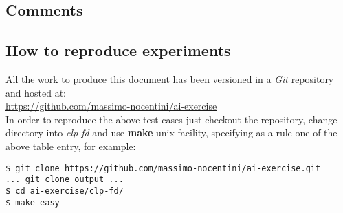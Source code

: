 \documentclass[10pt,a4paper]{article} %
\begin{document}
    \subsection{Comments}
    \lipsum[1]

    \subsection{How to reproduce experiments}
    All the work to produce this document has been versioned in a
    \emph{Git} repository and hosted at:\\
    \url{https://github.com/massimo-nocentini/ai-exercise}\\
    In order to reproduce the above test cases just checkout the
    repository, change directory into \emph{clp-fd} and use \textbf{make}
    unix facility, specifying as a rule one of the above table entry, for
    example:
    \begin{verbatim}
$ git clone https://github.com/massimo-nocentini/ai-exercise.git
... git clone output ...
$ cd ai-exercise/clp-fd/
$ make easy
    \end{verbatim}
\end{document}
